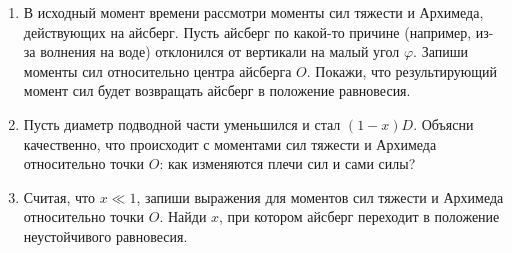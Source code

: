 \begin{enumerate}
\item В исходный момент времени рассмотри моменты сил тяжести и Архимеда, действующих на айсберг. Пусть айсберг по какой-то причине (например, из-за волнения на воде) отклонился от вертикали на малый угол $\varphi$. Запиши моменты сил относительно центра айсберга $O$. Покажи, что результирующий момент сил будет возвращать айсберг в положение равновесия.
\item Пусть диаметр подводной части уменьшился и стал $(1 - x) D$. Объясни качественно, что происходит с моментами сил тяжести и Архимеда относительно точки $O$: как изменяются плечи сил и сами силы?
\item Считая, что $x \ll 1$, запиши выражения для моментов сил тяжести и Архимеда относительно точки $O$. Найди $x$, при котором айсберг переходит в положение неустойчивого равновесия.
\end{enumerate}   
